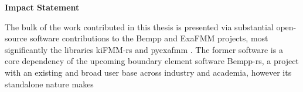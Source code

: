 
\thispagestyle{plain}

\begin{center}
    \textbf{Impact Statement}
\end{center}

The bulk of the work contributed in this thesis is presented via substantial open-source software contributions to the Bempp and ExaFMM projects, most significantly the libraries kiFMM-rs \cite{kailasa2024kifmmrs} and pyexafmm \cite{kailasa2022pyexafmm}. The former software is a core dependency of the upcoming boundary element software Bempp-rs, a project with an existing and broad user base across industry and academia, however its standalone nature makes
